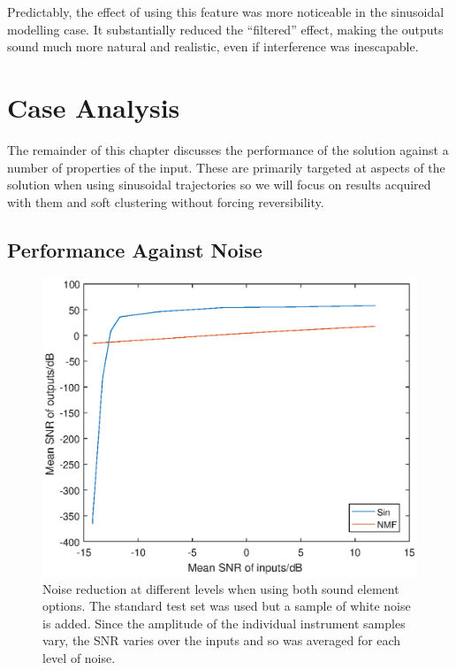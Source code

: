 \documentclass[12pt,a4paper,twoside,openright]{report}
\begin{document}
{\color{red}Predictably, the effect of using this feature was more noticeable in the sinusoidal modelling case. It substantially reduced the ``filtered'' effect, making the outputs sound much more natural and realistic, even if interference was inescapable.}

\section{Case Analysis}


The remainder of this chapter discusses the performance of the solution against a number of properties of the input. These are primarily targeted at aspects of the solution when using sinusoidal trajectories so we will focus on results acquired with them and soft clustering without forcing reversibility.

\subsection{Performance Against Noise}




\begin{figure}
\centering
\includegraphics[width=0.7\linewidth]{./NoisePlot}
\caption[Noise reduction at different levels when using both sound element options.]{Noise reduction at different levels when using both sound element options. The standard test set was used but a sample of white noise is added. Since the amplitude of the individual instrument samples vary, the SNR varies over the inputs and so was averaged for each level of noise.}
\label{fig:NoisePlot}
\end{figure}
\end{document}

